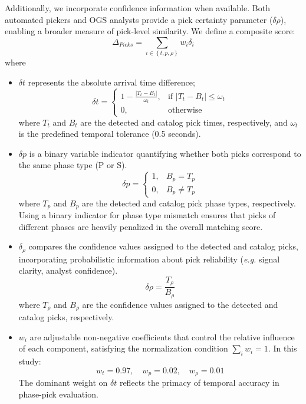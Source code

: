Additionally, we incorporate confidence information when available. Both
automated pickers and OGS analysts provide a pick certainty parameter
($\delta \rho$), enabling a broader measure of pick-level similarity. We define
a composite score:
$$\Delta_{Picks} = \sum_{i\in \left\{t, p, \rho\right\}} w_i \delta_i$$
where
\begin{itemize}
  \item $\delta t$ represents the absolute arrival time difference;
    $$\delta t =
    \begin{cases}
      1 - \frac{|T_t - B_t|}{\omega_t}, & \text{if } |T_t - B_t|
      \leq \omega_t \\
      0, & \text{otherwise}
    \end{cases}$$
    where $T_t$ and $B_t$ are the detected and catalog pick times,
    respectively,
    and $\omega_t$ is the predefined temporal tolerance (0.5 seconds).
  \item $\delta p$ is a binary variable indicator quantifying whether both
    picks correspond to the same phase type (P or S).
    $$\delta p =
    \begin{cases}
      1, & B_p = T_p\\
      0, & B_p \neq T_p
    \end{cases}$$
    where $T_p$ and $B_p$ are the detected and catalog pick phase types,
    respectively. Using a binary indicator for phase type mismatch ensures that
    picks of different phases are heavily penalized in the overall matching
    score.
  \item $\delta_\rho$ compares the confidence values assigned to the
    detected and catalog picks, incorporating probabilistic information about
    pick reliability (\textit{e.g.} signal clarity, analyst confidence).
    $$\delta \rho = \frac{T_\rho}{B_\rho}$$
    where $T_\rho$ and $B_\rho$ are the confidence values assigned to the
    detected and catalog picks, respectively.
  \item $w_i$ are adjustable non-negative coefficients that control the
    relative influence of each component, satisfying the normalization
    condition $\sum_i w_i = 1$. In this study:
    $$w_t=0.97, \quad w_p=0.02, \quad w_\rho=0.01$$
    The dominant weight on $\delta t$ reflects the primacy of temporal accuracy
    in phase-pick evaluation.
\end{itemize}

